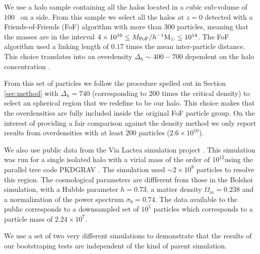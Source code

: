 \documentclass{emulateapj}
\newcommand{\hMpc}{{\ifmmode{h^{-1}{\rm Mpc}}\else{$h^{-1}$Mpc}\fi}}
\newcommand{\hMsun}{{\ifmmode{h^{-1}{\rm {M_{\odot}}}}\else{$h^{-1}{\rm{M_{\odot}}}$}\fi}}
\begin{document}
We use a halo sample containing all the halos located in a cubic
sub-volume of $100$ \hMpc\ on a side.  From this sample we select all
the halos at $z=0$ detected with a Friends-of-Friends (FoF) algorithm
with more than 300 particles, meaning that the masses are in the
interval $4\times 10^{10}\leq M_{\rm FoF}/\hMsun \leq 10^{14}$.  The
FoF algorithm used a linking length of $0.17$ times the mean
inter-particle distance. This choice translates into an overdensity
$\Delta_h\sim 400-700$ dependent on the halo concentration
\citep{More2011}.

From this set of particles we follow the procedure spelled out in
Section \ref{sec:method} with $\Delta_h=740$ (corresponding to $200$
times the critical density) to select an spherical region that we
redefine to be our halo.  This choice makes that the overdensities are
fully included inside the original FoF particle group.  On the
interest of providing a fair comparison against the density method we
only report results from overdensities with at least $200$ particles
($2.6\times 10^{10}$\hMsun).

We also use public data from the Via Lactea simulation project
\citep{2008Natur.454..735D}.  
This simulation was run for a single isolated halo with a virial mass
of the order of $10^{12}$\hMsun using the parallel tree code PKDGRAV
\citep{2001PhDT........21S}.  
The simulation used $\sim 2\times 10^{8}$ particles to resolve this
region.
The cosmological parameters are diffferent from those in the Bolshoi
simulation, with a Hubble parameter $h=0.73$, a matter density
$\Omega_m=0.238$ and a normalization of the power spectrum
$\sigma_8=0.74$. 
The data available to the public corresponds to a downsampled set 
of $10^5$ particles which corresponds to a particle mass of
$2.24\times 10^{7}$\hMsun.  


We use a set of two very different simulations to demonstrate that the 
results of our bootstraping tests are independent of the kind of
parent simulation.
\end{document}

